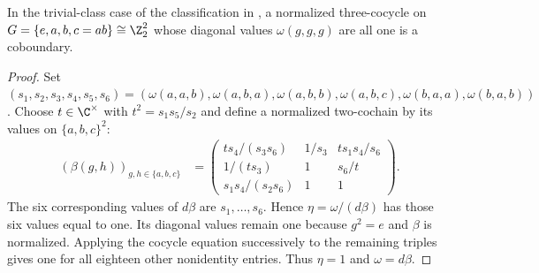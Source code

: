 \begin{lemma}
    \label{thm:asymex_klein_trivial_diagonal}
    \leanok
    In the trivial-class case of the classification in
    \cite[Section~6]{GarreRubio2023MPOSym}, a normalized three-cocycle on
    $G=\{e,a,b,c=ab\}\cong\Z_2^2$ whose diagonal values $\omega(g,g,g)$ are
    all one is a coboundary.
\end{lemma}
\begin{proof}
    \leanok
    Set $(s_1,s_2,s_3,s_4,s_5,s_6)=
        (\omega(a,a,b),\omega(a,b,a),\omega(a,b,b),\omega(a,b,c),
        \omega(b,a,a),\omega(b,a,b))$.
    Choose $t\in\C^\times$ with $t^2=s_1s_5/s_2$ and define a normalized
    two-cochain by its values on $\{a,b,c\}^2$:
    \begin{align}
        \label{eq:asymex_klein_trivial_gauge}
        (\beta(g,h))_{g,h\in\{a,b,c\}}
         & =\begin{pmatrix}
                ts_4/(s_3s_6)   & 1/s_3 & ts_1s_4/s_6 \\
                1/(ts_3)        & 1     & s_6/t       \\
                s_1s_4/(s_2s_6) & 1     & 1
            \end{pmatrix}.
    \end{align}
    The six corresponding values of $d\beta$ are $s_1,\ldots,s_6$.
    Hence $\eta=\omega/(d\beta)$ has those six values equal to one.
    Its diagonal values remain one because $g^2=e$ and $\beta$ is normalized.
    Applying the cocycle equation successively to the remaining triples
    gives one for all eighteen other nonidentity entries. Thus $\eta=1$
    and $\omega=d\beta$.
\end{proof}

